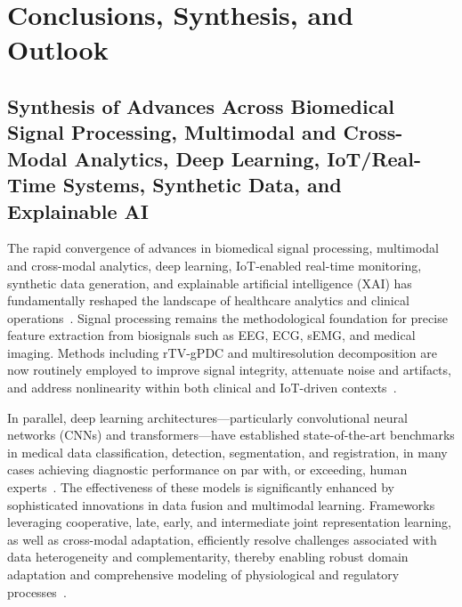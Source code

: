 \documentclass[sigconf]{acmart}
\begin{document}
\section{Conclusions, Synthesis, and Outlook}

\subsection{Synthesis of Advances Across Biomedical Signal Processing, Multimodal and Cross-Modal Analytics, Deep Learning, IoT/Real-Time Systems, Synthetic Data, and Explainable AI}

The rapid convergence of advances in biomedical signal processing, multimodal and cross-modal analytics, deep learning, IoT-enabled real-time monitoring, synthetic data generation, and explainable artificial intelligence (XAI) has fundamentally reshaped the landscape of healthcare analytics and clinical operations~\cite{ref16,ref17,ref18,ref19,ref20,ref21,ref22,ref23,ref24,ref25,ref28,ref29,ref30,ref31,ref32,ref33,ref34,ref35,ref36,ref37,ref38,ref39,ref40,ref41,ref42,ref43,ref44,ref45,ref46,ref47,ref48,ref49,ref50,ref51,ref52,ref53,ref54,ref55,ref56,ref57,ref58,ref59,ref60,ref61,ref62,ref63,ref64,ref65,ref66,ref67,ref68,ref69,ref70,ref71,ref72,ref73,ref74,ref75,ref76,ref77,ref78,ref79,ref80,ref81,ref82,ref83,ref84,ref85,ref86,ref87,ref88,ref89,ref90,ref91,ref92,ref94,ref95,ref96,ref97,ref98,ref99,ref100,ref101,ref102,ref103,ref104,ref105,ref106,ref107}. Signal processing remains the methodological foundation for precise feature extraction from biosignals such as EEG, ECG, sEMG, and medical imaging. Methods including rTV-gPDC and multiresolution decomposition are now routinely employed to improve signal integrity, attenuate noise and artifacts, and address nonlinearity within both clinical and IoT-driven contexts~\cite{ref16,ref17,ref19}. 

In parallel, deep learning architectures---particularly convolutional neural networks (CNNs) and transformers---have established state-of-the-art benchmarks in medical data classification, detection, segmentation, and registration, in many cases achieving diagnostic performance on par with, or exceeding, human experts~\cite{ref40,ref43,ref44,ref49,ref54,ref57,ref60,ref63}. The effectiveness of these models is significantly enhanced by sophisticated innovations in data fusion and multimodal learning. Frameworks leveraging cooperative, late, early, and intermediate joint representation learning, as well as cross-modal adaptation, efficiently resolve challenges associated with data heterogeneity and complementarity, thereby enabling robust domain adaptation and comprehensive modeling of physiological and regulatory processes~\cite{ref30,ref31,ref32,ref33,ref34,ref35,ref36,ref37,ref39,ref41,ref47,ref48,ref51,ref64,ref65}.
\end{document}
